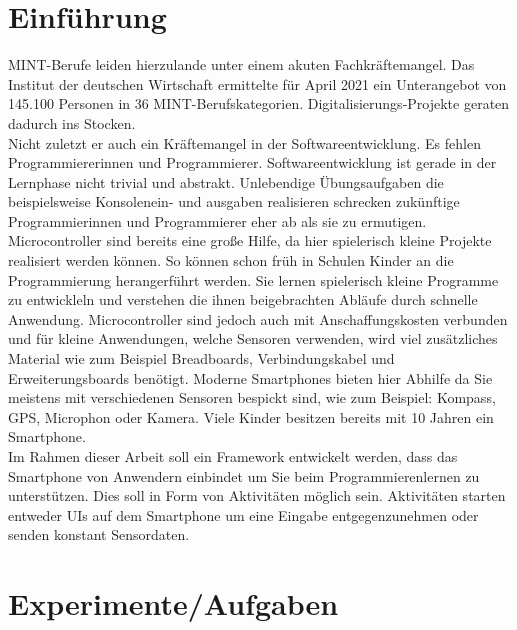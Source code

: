 \documentclass[11pt,a4paper]{report}
\begin{document}

\begin{abstract} 

\end{abstract}

\tableofcontents

\chapter{Einführung} \label{chap:intro}
MINT-Berufe leiden hierzulande unter einem akuten Fachkräftemangel.
Das Institut der deutschen Wirtschaft ermittelte für April 2021 ein Unterangebot von 145.100 Personen \cite{mint_jahresreport} in 36 MINT-Berufskategorien. 
Digitalisierungs-Projekte geraten dadurch ins Stocken.
\\
Nicht zuletzt er auch ein Kräftemangel in der Softwareentwicklung.
Es fehlen Programmiererinnen und Programmierer.
Softwareentwicklung ist gerade in der Lernphase nicht trivial und abstrakt.
Unlebendige Übungsaufgaben die beispielsweise Konsolenein- und ausgaben realisieren schrecken zukünftige Programmierinnen und Programmierer eher ab als sie zu ermutigen.
\\
Microcontroller sind bereits eine große Hilfe, da hier spielerisch kleine Projekte realisiert werden können.
So können schon früh in Schulen Kinder an die Programmierung herangerführt werden.
Sie lernen spielerisch kleine Programme zu entwickleln und verstehen die ihnen beigebrachten Abläufe durch schnelle Anwendung.
Microcontroller sind jedoch auch mit Anschaffungskosten verbunden und für kleine Anwendungen, welche Sensoren verwenden, wird viel zusätzliches Material wie zum Beispiel Breadboards, Verbindungskabel und Erweiterungsboards benötigt.
Moderne Smartphones bieten hier Abhilfe da Sie meistens mit verschiedenen Sensoren bespickt sind, wie zum Beispiel: Kompass, GPS, Microphon oder Kamera.
Viele Kinder besitzen bereits mit 10 Jahren \cite{bitkom_smartphones} ein Smartphone. 
\\
Im Rahmen dieser Arbeit soll ein Framework entwickelt werden, dass das Smartphone von Anwendern einbindet um Sie beim Programmierenlernen zu unterstützen.
Dies soll in Form von Aktivitäten möglich sein. Aktivitäten starten entweder UIs auf dem Smartphone um eine Eingabe entgegenzunehmen oder senden konstant Sensordaten.

\chapter{Experimente/Aufgaben} \label{chap:Experimente}
\end{document}
